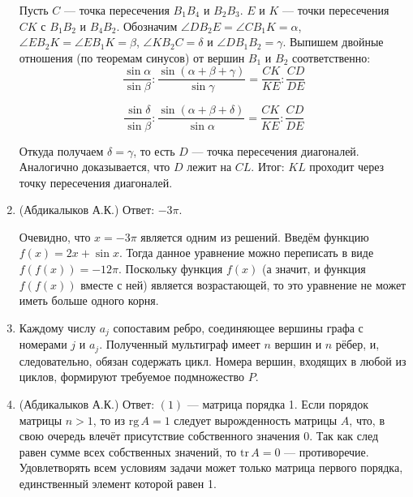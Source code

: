 \begin{enumerate}
Пусть $C$ --- точка пересечения $B_1B_4$ и $B_2B_3$. $E$ и $K$ --- точки пересечения $CK$ с $B_1B_2$ и $B_4B_2$. Обозначим $\angle DB_2E = \angle CB_1K = \alpha$, $\angle EB_2K = \angle EB_1K = \beta$, $\angle KB_2C = \delta$ и $\angle DB_1B_2 = \gamma$. Выпишем двойные отношения (по теоремам синусов) от вершин $B_1$ и $B_2$ соответственно:
$$ \frac{\sin{\alpha}}{\sin{\beta}}: \frac{\sin(\alpha+\beta+\gamma)}{\sin{\gamma}} = \frac{CK}{KE} : \frac{CD}{DE}$$

$$\frac{\sin{\delta}}{\sin{\beta}}: \frac{\sin(\alpha+\beta+\delta)}{\sin{\alpha}} = 
\frac{CK}{KE} : \frac{CD}{DE}$$

Откуда получаем $\delta = \gamma$, то есть $D$ --- точка пересечения диагоналей. Аналогично доказывается, что $D$ лежит на $CL$. Итог: $KL$ проходит через точку пересечения диагоналей.

\item (Абдикалыков А.К.) Ответ: $-3\pi$. 

Очевидно, что $x=-3\pi$ является одним из решений. Введём функцию $f(x)=2x+\sin x$. Тогда данное уравнение можно переписать в виде $f(f(x))=-12\pi$. Поскольку функция $f(x)$ (а значит, и функция $f(f(x))$ вместе с ней) является возрастающей, то это уравнение не может иметь больше одного корня.

\item Каждому числу $a_j$ сопоставим ребро, соединяющее вершины графа с номерами $j$ и $a_j$. Полученный мультиграф имеет $n$ вершин и $n$ рёбер, и, следовательно, обязан содержать цикл. Номера вершин, входящих в любой из циклов, формируют требуемое подмножество $P$.

\item (Абдикалыков А.К.) Ответ: $(1)$ --- матрица порядка 1. Если порядок матрицы $n>1$, то из $\mathrm{rg}\,A=1$ следует вырожденность матрицы $A$, что, в свою очередь влечёт присутствие собственного значения 0. Так как след равен сумме всех собственных значений, то $\mathrm{tr}\,A=0$ --- противоречие. Удовлетворять всем условиям задачи может только матрица первого порядка, единственный элемент которой равен 1.

\end{enumerate}